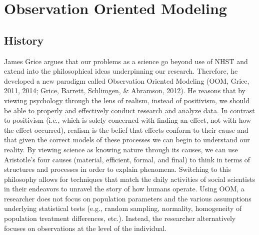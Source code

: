 \documentclass[english,man]{apa6}
\theoremstyle{definition}
\theoremstyle{definition}
\theoremstyle{definition}
\theoremstyle{remark}
\begin{document}
\section{Observation Oriented
Modeling}\label{observation-oriented-modeling}

\subsection{History}\label{history-2}

James Grice argues that our problems as a science go beyond use of NHST
and extend into the philosophical ideas underpinning our research.
Therefore, he developed a new paradigm called Observation Oriented
Modeling (OOM, Grice, 2011, 2014; Grice, Barrett, Schlimgen, \&
Abramson, 2012). He reasons that by viewing psychology through the lens
of realism, instead of positivism, we should be able to properly and
effectively conduct research and analyze data. In contrast to positivism
(i.e., which is solely concerned with finding an effect, not with how
the effect occurred), realism is the belief that effects conform to
their cause and that given the correct models of these processes we can
begin to understand our reality. By viewing science as knowing nature
through its causes, we can use Aristotle's four causes (material,
efficient, formal, and final) to think in terms of structures and
processes in order to explain phenomena. Switching to this philosophy
allows for techniques that match the daily activities of social
scientists in their endeavors to unravel the story of how humans
operate. Using OOM, a researcher does not focus on population parameters
and the various assumptions underlying statistical tests (e.g., random
sampling, normality, homogeneity of population treatment differences,
etc.). Instead, the researcher alternatively focuses on observations at
the level of the individual.
\end{document}

